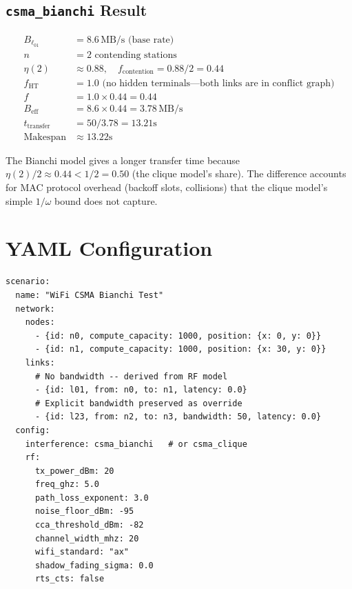 \documentclass[11pt,letterpaper]{article}
\newcommand{\MBps}{\,\text{MB/s}}
\begin{document}
\subsection{\texttt{csma\_bianchi} Result}

\begin{align*}
B_{\ell_{01}} &= 8.6\MBps \text{ (base rate)} \\
n &= 2 \text{ contending stations} \\
\eta(2) &\approx 0.88, \quad f_\text{contention} = 0.88 / 2 = 0.44 \\
f_\text{HT} &= 1.0 \text{ (no hidden terminals---both links are in conflict graph)} \\
f &= 1.0 \times 0.44 = 0.44 \\
B_\text{eff} &= 8.6 \times 0.44 = 3.78\MBps \\
t_\text{transfer} &= 50 / 3.78 = 13.21\text{s} \\
\text{Makespan} &\approx 13.22\text{s}
\end{align*}

The Bianchi model gives a longer transfer time because $\eta(2)/2 \approx
0.44 < 1/2 = 0.50$ (the clique model's share).  The difference accounts for
MAC protocol overhead (backoff slots, collisions) that the clique model's
simple $1/\omega$ bound does not capture.

\section{YAML Configuration}
\label{sec:yaml}

\begin{lstlisting}[language={},caption={WiFi scenario YAML example.}]
scenario:
  name: "WiFi CSMA Bianchi Test"
  network:
    nodes:
      - {id: n0, compute_capacity: 1000, position: {x: 0, y: 0}}
      - {id: n1, compute_capacity: 1000, position: {x: 30, y: 0}}
    links:
      # No bandwidth -- derived from RF model
      - {id: l01, from: n0, to: n1, latency: 0.0}
      # Explicit bandwidth preserved as override
      - {id: l23, from: n2, to: n3, bandwidth: 50, latency: 0.0}
  config:
    interference: csma_bianchi   # or csma_clique
    rf:
      tx_power_dBm: 20
      freq_ghz: 5.0
      path_loss_exponent: 3.0
      noise_floor_dBm: -95
      cca_threshold_dBm: -82
      channel_width_mhz: 20
      wifi_standard: "ax"
      shadow_fading_sigma: 0.0
      rts_cts: false
\end{lstlisting}
\end{document}
